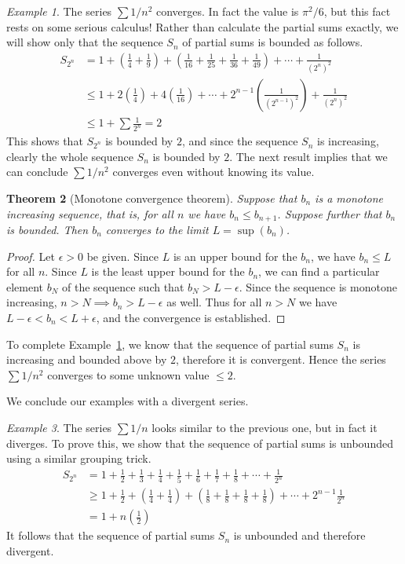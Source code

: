 \documentclass[11pt,oneside]{amsbook}
\theoremstyle{definition}
\theoremstyle{plain}
\newtheorem{theorem}{Theorem}[section]
\theoremstyle{definition}
\theoremstyle{remark}
\newtheorem{example}[theorem]{Example}
\numberwithin{equation}{section}
\numberwithin{figure}{section}
\begin{document}
\begin{example}
  \label{ex:1/n^2}
  The series $\sum1/n^2$ converges. In fact the value is $\pi^2/6$, but this fact rests on some serious calculus! Rather than calculate the partial sums exactly, we will show only that the sequence $S_n$ of partial sums is bounded as follows. 
  \begin{align*}
    S_{2^n}&=1+\left(\frac14+\frac19\right)
             +\left(\frac1{16}+\frac1{25}+\frac1{36}+\frac1{49}\right)
             +\cdots
             +\frac1{(2^n)^2}\\
           &\leq1+2\left(\frac14\right)+4\left(\frac1{16}\right)
             +\cdots+2^{n-1}\left(\frac1{(2^{n-1})^2}\right)+\frac1{(2^n)^2}\\
           &\leq1+\sum\frac1{2^n}=2
  \end{align*}
  This shows that $S_{2^n}$ is bounded by $2$, and since the sequence $S_n$ is increasing, clearly the whole sequence $S_n$ is bounded by $2$. The next result implies that we can conclude $\sum1/n^2$ converges even without knowing its value.
\end{example}

\begin{theorem}[Monotone convergence theorem]
  Suppose that $b_n$ is a monotone increasing sequence, that is, for all $n$ we have $b_n\leq b_{n+1}$. Suppose further that $b_n$ is bounded. Then $b_n$ converges to the limit $L=\sup(b_n)$.
\end{theorem}

\begin{proof}
  Let $\epsilon>0$ be given. Since $L$ is an upper bound for the $b_n$, we have $b_n\leq L$ for all $n$. Since $L$ is the least upper bound for the $b_n$, we can find a particular element $b_N$ of the sequence such that $b_N>L-\epsilon$. Since the sequence is monotone increasing, $n>N\implies b_n>L-\epsilon$ as well. Thus for all $n>N$ we have $L-\epsilon<b_n<L+\epsilon$, and the convergence is established.
\end{proof}

To complete Example~\ref{ex:1/n^2}, we know that the sequence of partial sums $S_n$ is increasing and bounded above by $2$, therefore it is convergent. Hence the series $\sum1/n^2$ converges to some unknown value $\leq2$.

We conclude our examples with a divergent series.

\begin{example}
  The series $\sum 1/n$ looks similar to the previous one, but in fact it diverges. To prove this, we show that the sequence of partial sums is unbounded using a similar grouping trick.
\begin{align*}
  S_{2^n} &= 1+\frac12+\frac13+\frac14+\frac15+\frac16+\frac17+\frac18+
            \cdots+\frac1{2^n}\\
          &\geq 1+\frac12+\left(\frac14+\frac14\right)
            +\left(\frac18+\frac18+\frac18+\frac18\right)
            +\cdots+2^{n-1}\frac1{2^n}\\
          &=1+n\left(\frac12\right)
\end{align*}
It follows that the sequence of partial sums $S_n$ is unbounded and therefore divergent.
\end{example}
\end{document}
